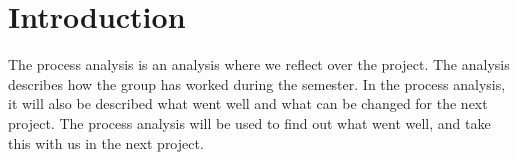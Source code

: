 \chapter{Introduction}
The process analysis is an analysis where we reflect over the project. The analysis describes how the group has worked during the semester. In the process analysis, it will also be described what went well and what can be changed for the next project. The process analysis will be used to find out what went well, and take this with us in the next project. 